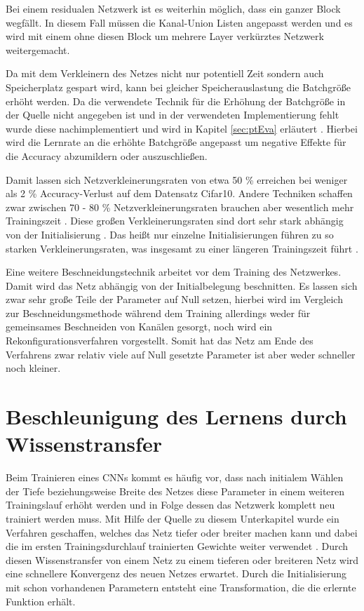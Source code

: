 Bei einem residualen Netzwerk ist es weiterhin möglich, dass ein ganzer Block wegfällt. In diesem Fall müssen die Kanal-Union Listen angepasst werden und es wird mit einem ohne diesen Block um mehrere Layer verkürztes Netzwerk weitergemacht.


Da mit dem Verkleinern des Netzes nicht nur potentiell Zeit sondern auch Speicherplatz gespart wird, kann bei gleicher Speicherauslastung die Batchgröße erhöht werden. Da die verwendete Technik für die Erhöhung der Batchgröße in der Quelle nicht angegeben ist und in der verwendeten Implementierung fehlt wurde diese nachimplementiert und wird in Kapitel \ref{sec:ptEva} erläutert \cite{ptImpl}. Hierbei wird die Lernrate an die erhöhte Batchgröße angepasst um negative Effekte für die Accuracy abzumildern oder auszuschließen. 

Damit lassen sich Netzverkleinerungsraten von etwa 50 \% erreichen bei weniger als 2 \% Accuracy-Verlust auf dem Datensatz Cifar10. Andere Techniken schaffen zwar zwischen 70 - 80 \% Netzverkleinerungsraten brauchen aber wesentlich mehr Trainingszeit \cite{lottery}. Diese großen Verkleinerungsraten sind dort sehr stark abhängig von der Initialisierung \cite{lottery}. Das heißt nur einzelne Initialisierungen führen zu so starken Verkleinerungsraten, was insgesamt zu einer längeren Trainingszeit führt \cite{lottery}. 


Eine weitere Beschneidungstechnik arbeitet vor dem Training des Netzwerkes\cite{snyc}. Damit wird das Netz abhängig von der Initialbelegung beschnitten. Es lassen sich zwar sehr große Teile der Parameter auf Null setzen, hierbei wird im Vergleich zur Beschneidungsmethode während dem Training allerdings weder für gemeinsames Beschneiden von Kanälen gesorgt, noch wird ein Rekonfigurationsverfahren vorgestellt. Somit hat das Netz am Ende des Verfahrens zwar relativ viele auf Null gesetzte Parameter ist aber weder schneller noch kleiner.


\section{Beschleunigung des Lernens durch Wissenstransfer}
\label{sec:net2net}
Beim Trainieren eines CNNs kommt es häufig vor, dass nach initialem Wählen der Tiefe beziehungsweise Breite des Netzes diese Parameter in einem weiteren Trainingslauf erhöht werden und in Folge dessen das Netzwerk komplett neu trainiert werden muss. Mit Hilfe der Quelle zu diesem Unterkapitel wurde ein Verfahren geschaffen, welches das Netz tiefer oder breiter machen kann und dabei die im ersten Trainingsdurchlauf trainierten Gewichte weiter verwendet \cite{net2net}. Durch diesen Wissenstransfer von einem Netz zu einem tieferen oder breiteren Netz wird eine schnellere Konvergenz des neuen Netzes erwartet. Durch die Initialisierung mit schon vorhandenen Parametern entsteht eine Transformation, die die erlernte Funktion erhält.

